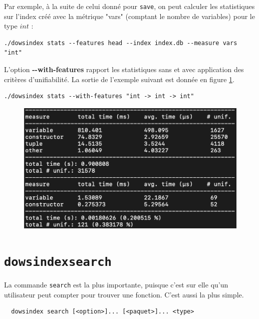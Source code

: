 \documentclass[a4paper]{report}
\theoremstyle{definition}
\newcommand{\dowsindex}{\texttt{dowsindex}\xspace}
\begin{document}
{Par exemple, à la suite de celui donné pour \texttt{save}, on peut calculer les statistiques sur l'index créé avec la métrique "vars" (comptant le nombre de variables) pour le type $int$ :

\begin{verbatim}
./dowsindex stats --features head --index index.db --measure vars "int"
\end{verbatim}

L'option \textbf{-{}-with-features} rapport les statistiques sans et avec application des critères d'unifiabilité. La sortie de l'exemple suivant est donnée en figure \ref{fig_dowsindex_save}.

\begin{verbatim}
./dowsindex stats --with-features "int -> int -> int"
\end{verbatim}

\begin{figure}[h]
  \begin{center}
    \includegraphics[scale=0.22]{images/dowsindex-save}
  \end{center}
  \caption{\label{fig_dowsindex_save}}
\end{figure}


\section{\dowsindex \texttt{search}}

La commande \texttt{search} est la plus importante, puisque c'est sur elle qu'un utilisateur peut compter pour trouver une fonction. C'est aussi la plus simple.

\begin{center}
  \begin{verbatim}
  dowsindex search [<option>]... [<paquet>]... <type>
  \end{verbatim}
\end{center}

}
\end{document}
